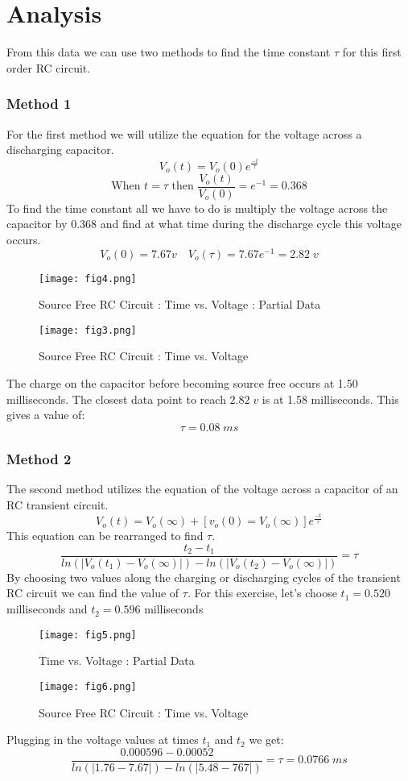 \documentclass[11pt]{article}
\begin{document}
\section*{Analysis}
From this data we can use two methods to find the time constant $\tau$ for this first order RC circuit.
\subsubsection*{Method 1}
For the first method we will utilize the equation for the voltage across a discharging capacitor.
$$ V_o(t) = V_o(0)e^{\frac{-t}{\tau}}$$
$$\text{When }t = \tau \text{ then } \frac{V_o(t)}{V_o(0)} = e^{-1} = 0.368$$
To find the time constant all we have to do is multiply the voltage across the capacitor by 0.368 and find at what time during the discharge cycle this voltage occurs. 
$$V_o(0) = 7.67 v \quad V_o(\tau) = 7.67e^{-1} = 2.82 \; v$$
\begin{figure}[H]
  \centering
  \texttt{[image: fig4.png]}
  \caption{Source Free RC Circuit : Time vs. Voltage : Partial Data}
  \label{fig:3}
\end{figure}
\begin{figure}[H]
  \centering
  \texttt{[image: fig3.png]}
  \caption{Source Free RC Circuit : Time vs. Voltage}
  \label{fig:4}
\end{figure}
The charge on the capacitor before becoming source free occurs at 1.50 milliseconds. The closest data point to reach $2.82\; v$ is at 1.58 milliseconds. This gives a value of:
$$\tau = 0.08 \; ms$$
\subsubsection*{Method 2}
The second method utilizes the equation of the voltage across a capacitor of an RC transient circuit.
$$V_o(t) = V_o(\infty)+[v_o(0)=V_o(\infty)]e^{\frac{-t}{\tau}}$$
This equation can be rearranged to find $\tau$.
$$\frac{t_2-t_1}{ln(|V_o(t_1)-V_o(\infty)|)-ln(|V_o(t_2)-V_o(\infty)|)} = \tau$$
By choosing two values along the charging or discharging cycles of the transient RC circuit we can find the value of $\tau$. For this exercise, let's choose $t_1 = 0.520$ milliseconds and $t_2 = 0.596$ milliseconds
\begin{figure}[H]
  \centering
  \texttt{[image: fig5.png]}
  \caption{Time vs. Voltage : Partial Data}
  \label{fig:5}
\end{figure}
\begin{figure}[H]
  \centering
  \texttt{[image: fig6.png]}
  \caption{Source Free RC Circuit : Time vs. Voltage}
  \label{fig:6}
\end{figure}
Plugging in the voltage values at times $t_1$ and $t_2$ we get:
$$\frac{0.000596-0.00052}{ln(|1.76-7.67|)-ln(|5.48-767|)} = \tau = 0.0766 \; ms$$
\end{document}
